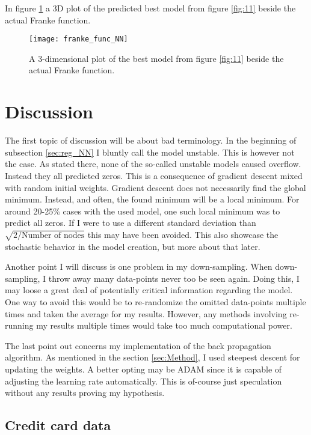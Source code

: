 \documentclass[uio,jmp,amsmath,amssymb,reprint,nofootinbib]{revtex4-1}
\numberwithin{equation}{section}
\begin{document}
In figure \ref{fig:16} a 3D plot of the predicted best model from figure \ref{fig:11} beside the actual Franke function.

\begin{figure}[H]
    \centering
    \texttt{[image: franke\_func\_NN]}
    \caption{A 3-dimensional plot of the best model from figure \ref{fig:11} beside the actual Franke function.}
    \label{fig:16}
\end{figure}



\section{Discussion}\label{sec:Discussion}

The first topic of discussion will be about bad terminology. In the beginning of subsection \ref{sec:reg_NN} I bluntly call the model unstable. This is however not the case. As stated there, none of the so-called unstable models caused overflow. Instead they all predicted zeros. This is a consequence of gradient descent mixed with random initial weights. Gradient descent does not necessarily find the global minimum. Instead, and often, the found minimum will be a local minimum. For around 20-25\% cases with the used model, one such local minimum was to predict all zeros. If I were to use a different standard deviation than \(\sqrt{2/\text{Number of nodes}}\) this may have been avoided. This also showcase the stochastic behavior in the model creation, but more about that later.

Another point I will discuss is one problem in my down-sampling. When down-sampling, I throw away many data-points never too be seen again. Doing this, I may loose a great deal of potentially critical information regarding the model. One way to avoid this would be to re-randomize the omitted data-points multiple times and taken the average for my results. However, any methods involving re-running my results multiple times would take too much computational power.

The last point out concerns my implementation of the back propagation algorithm. As mentioned in the section \ref{sec:Method}, I used steepest descent for updating the weights. A better opting may be ADAM since it is capable of adjusting the learning rate automatically. This is of-course just speculation without any results proving my hypothesis.

\subsection{Credit card data}
\end{document}
